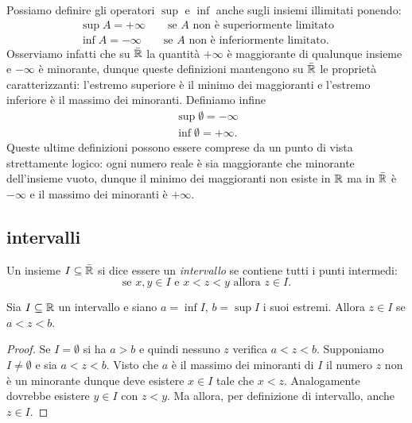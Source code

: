 Possiamo definire gli operatori $\sup$ e $\inf$
anche sugli insiemi illimitati ponendo:
\begin{align*}
  \sup A = +\infty \qquad \text{se $A$ non è superiormente limitato}\\
  \inf A = -\infty \qquad \text{se $A$ non è inferiormente limitato}.
\end{align*}
Osserviamo infatti che su $\bar {{\mathbb R}}$ la quantità $+\infty$
è maggiorante di qualunque insieme e $-\infty$ è minorante, dunque
queste definizioni mantengono su $\bar {{\mathbb R}}$ le proprietà caratterizzanti:
l'estremo superiore è il minimo dei maggioranti e
l'estremo inferiore è il massimo dei minoranti.
Definiamo infine
\begin{align*}
  \sup \emptyset = -\infty\\
  \inf \emptyset = +\infty.
\end{align*}
Queste ultime definizioni possono essere comprese da un punto di vista
strettamente logico: ogni numero reale è sia maggiorante che minorante
dell'insieme vuoto, dunque il minimo dei maggioranti non esiste in ${\mathbb R}$
ma in $\bar {{\mathbb R}}$ è $-\infty$
e il massimo dei minoranti è $+\infty$.

\subsection{intervalli}

\begin{definition}[intervallo]
\label{def:intervallo}%
%
%
Un insieme $I\subseteq \bar{{\mathbb R}}$ si dice essere un \emph{intervallo}
se contiene tutti i punti intermedi:
\[
  \text{se $x, y \in I$ e $x<z<y$ allora $z \in I$.}
\]
\end{definition}
%
\begin{theorem}
Sia $I\subseteq {\mathbb R}$ un intervallo e siano $a=\inf I$, $b=\sup I$
i suoi estremi. Allora
$z\in I$ se $a < z < b$.
\end{theorem}
%
\begin{proof}
Se $I=\emptyset$ si ha $a>b$ e quindi nessuno $z$ verifica $a<z<b$.
Supponiamo $I\neq \emptyset$ e
sia $a < z < b$.
Visto che $a$ è il massimo dei minoranti di $I$
il numero $z$ non è un minorante dunque
deve esistere $x \in I$ tale
che $x < z$. Analogamente dovrebbe esistere $y\in I$
con $z<y$.
Ma allora, per definizione di intervallo, anche $z\in I$.
\end{proof}


